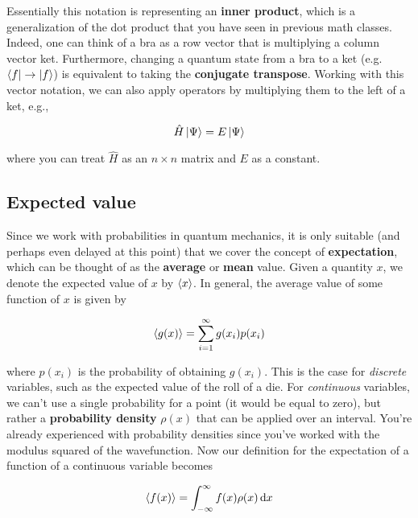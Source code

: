Essentially this notation is representing an \textbf{inner product}, which is a generalization of the dot product that you have seen in previous math classes. 
Indeed, one can think of a bra as a row vector that is multiplying a column vector ket. 
Furthermore, changing a quantum state from a bra to a ket (e.g. $\bra{f} \rightarrow \ket{f}$) is equivalent to taking the \textbf{conjugate transpose}. 
Working with this vector notation, we can also apply operators by multiplying them to the left of a ket, e.g.,

\begin{equation*}
	\hat{H} \ket{\Psi} = E\ket{\Psi} 
\end{equation*}

\noindent where you can treat $\hat{H}$ as an $n\times n$ matrix and $E$ as a constant.


\subsection{Expected value}

Since we work with probabilities in quantum mechanics, it is only suitable (and perhaps even delayed at this point) that we cover the concept of \textbf{expectation}, which can be thought of as the \textbf{average} or \textbf{mean} value. 
Given a quantity $x$, we denote the expected value of $x$ by $\expval{x}$. 
In general, the average value of some function of $x$ is given by 

\begin{equation}
	\expval{g(x)} = \sum_{i=1}^{\infty} g(x_i) p(x_i)
\end{equation}

\noindent where $p(x_i)$ is the probability of obtaining $g(x_i)$. 
This is the case for \emph{discrete} variables, such as the expected value of the roll of a die. 
For \emph{continuous} variables, we can't use a single probability for a point (it would be equal to zero), but rather a \textbf{probability density} $\rho(x)$ that can be applied over an interval. 
You're already experienced with probability densities since you've worked with the modulus squared of the wavefunction. 
Now our definition for the expectation of a function of a continuous variable becomes

\begin{equation}
	\expval{f(x)} = \int_{-\infty}^{\infty} f(x) \rho(x) \dd{x}
\end{equation}

